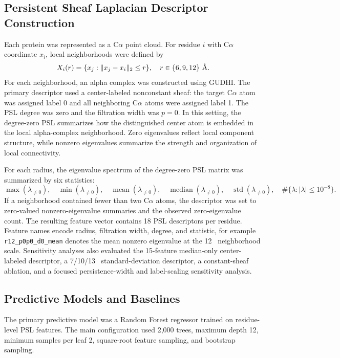 \documentclass[11pt]{article}
\newcommand{\angstrom}{\text{\normalfont\AA}\xspace}
\newcommand{\calpha}{C\ensuremath{\alpha}\xspace}
\begin{document}
\subsection{Persistent Sheaf Laplacian Descriptor Construction}
Each protein was represented as a \calpha point cloud. For residue $i$ with \calpha coordinate $x_i$, local neighborhoods were defined by
\begin{equation}
X_i(r) = \{x_j : \lVert x_j - x_i \rVert_2 \le r\},
\quad r \in \{6, 9, 12\}\ \angstrom .
\end{equation}
For each neighborhood, an alpha complex was constructed using GUDHI. The primary descriptor used a center-labeled nonconstant sheaf: the target \calpha atom was assigned label 0 and all neighboring \calpha atoms were assigned label 1. The PSL degree was zero and the filtration width was $p=0$. In this setting, the degree-zero PSL summarizes how the distinguished center atom is embedded in the local alpha-complex neighborhood. Zero eigenvalues reflect local component structure, while nonzero eigenvalues summarize the strength and organization of local connectivity.

For each radius, the eigenvalue spectrum of the degree-zero PSL matrix was summarized by six statistics:
\begin{equation}
\max(\lambda_{\neq 0}),\quad \min(\lambda_{\neq 0}),\quad
\operatorname{mean}(\lambda_{\neq 0}),\quad
\operatorname{median}(\lambda_{\neq 0}),\quad
\operatorname{std}(\lambda_{\neq 0}),\quad
\#\{\lambda: |\lambda| \le 10^{-8}\}.
\end{equation}
If a neighborhood contained fewer than two \calpha atoms, the descriptor was set to zero-valued nonzero-eigenvalue summaries and the observed zero-eigenvalue count. The resulting feature vector contains 18 PSL descriptors per residue. Feature names encode radius, filtration width, degree, and statistic, for example \texttt{r12\_p0p0\_d0\_mean} denotes the mean nonzero eigenvalue at the 12~\angstrom neighborhood scale. Sensitivity analyses also evaluated the 15-feature median-only center-labeled descriptor, a 7/10/13~\angstrom standard-deviation descriptor, a constant-sheaf ablation, and a focused persistence-width and label-scaling sensitivity analysis.

\subsection{Predictive Models and Baselines}
The primary predictive model was a Random Forest regressor trained on residue-level PSL features. The main configuration used 2,000 trees, maximum depth 12, minimum samples per leaf 2, square-root feature sampling, and bootstrap sampling.
\end{document}
